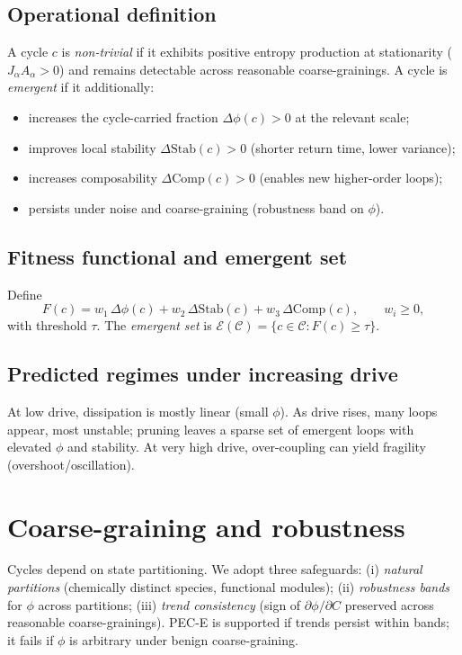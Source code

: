 \documentclass[11pt,a4paper]{article}
\newcommand{\phifrac}{\phi}
\newcommand{\comp}{\mathrm{Comp}}
\newcommand{\stab}{\mathrm{Stab}}
\newcommand{\Eset}{\mathcal{E}}
\newcommand{\Cset}{\mathcal{C}}
\begin{document}
\subsection{Operational definition}
A cycle $c$ is \emph{non-trivial} if it exhibits positive entropy production at stationarity ($J_{\alpha}A_{\alpha}>0$) and remains detectable across reasonable coarse-grainings. A cycle is \emph{emergent} if it additionally:
\begin{itemize}
  \item increases the cycle-carried fraction $\Delta\phifrac(c) > 0$ at the relevant scale;
  \item improves local stability $\Delta\stab(c) > 0$ (shorter return time, lower variance);
  \item increases composability $\Delta\comp(c) > 0$ (enables new higher-order loops);
  \item persists under noise and coarse-graining (robustness band on $\phifrac$).
\end{itemize}

\subsection{Fitness functional and emergent set}
Define
\begin{equation}
F(c) = w_1\,\Delta\phifrac(c) + w_2\,\Delta\stab(c) + w_3\,\Delta\comp(c),\qquad w_i\ge 0,
\end{equation}
with threshold $\tau$. The \emph{emergent set} is $\Eset(\Cset)=\{c\in\Cset: F(c)\ge \tau\}$.

\subsection{Predicted regimes under increasing drive}
At low drive, dissipation is mostly linear (small $\phifrac$). As drive rises, many loops appear, most unstable; pruning leaves a sparse set of emergent loops with elevated $\phifrac$ and stability. At very high drive, over-coupling can yield fragility (overshoot/oscillation).

\section{Coarse-graining and robustness}
Cycles depend on state partitioning. We adopt three safeguards: (i) \emph{natural partitions} (chemically distinct species, functional modules); (ii) \emph{robustness bands} for $\phifrac$ across partitions; (iii) \emph{trend consistency} (sign of $\partial\phifrac/\partial C$ preserved across reasonable coarse-grainings). PEC-E is supported if trends persist within bands; it fails if $\phifrac$ is arbitrary under benign coarse-graining.
\end{document}
